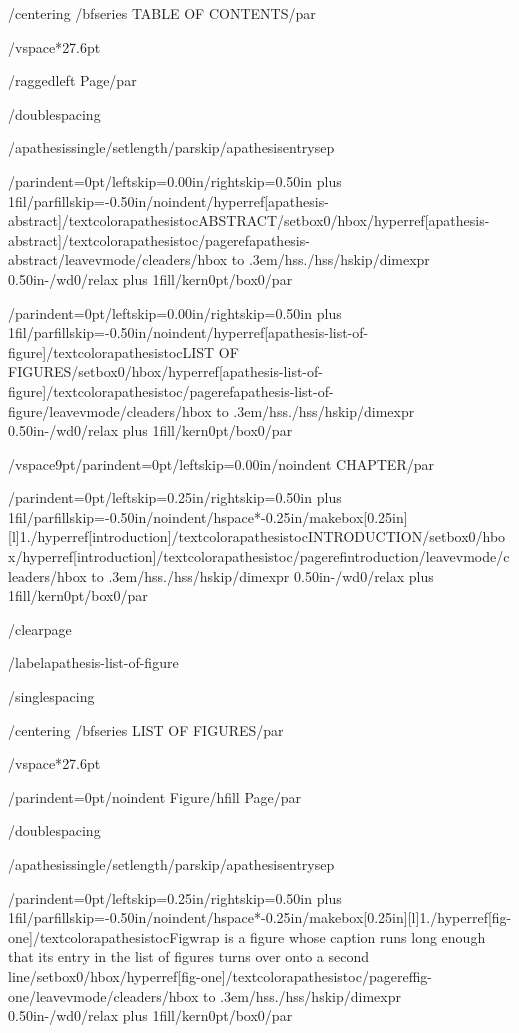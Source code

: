 {/centering
/bfseries TABLE OF CONTENTS/par}

/vspace*{27.6pt}

{/raggedleft
Page/par}

/doublespacing

{/apathesissingle/setlength{/parskip}{/apathesisentrysep}

{/parindent=0pt/leftskip=0.00in/rightskip=0.50in plus 1fil/parfillskip=-0.50in/noindent/hyperref[apathesis-abstract]{/textcolor{apathesistoc}{ABSTRACT}}/setbox0/hbox{/hyperref[apathesis-abstract]{/textcolor{apathesistoc}{/pageref{apathesis-abstract}}}}/leavevmode/cleaders/hbox to .3em{/hss./hss}/hskip/dimexpr 0.50in-/wd0/relax plus 1fill/kern0pt/box0/par}

{/parindent=0pt/leftskip=0.00in/rightskip=0.50in plus 1fil/parfillskip=-0.50in/noindent/hyperref[apathesis-list-of-figure]{/textcolor{apathesistoc}{LIST OF FIGURES}}/setbox0/hbox{/hyperref[apathesis-list-of-figure]{/textcolor{apathesistoc}{/pageref{apathesis-list-of-figure}}}}/leavevmode/cleaders/hbox to .3em{/hss./hss}/hskip/dimexpr 0.50in-/wd0/relax plus 1fill/kern0pt/box0/par}

/vspace{9pt}{/parindent=0pt/leftskip=0.00in/noindent CHAPTER/par}

{/parindent=0pt/leftskip=0.25in/rightskip=0.50in plus 1fil/parfillskip=-0.50in/noindent/hspace*{-0.25in}/makebox[0.25in][l]{1.}/hyperref[introduction]{/textcolor{apathesistoc}{INTRODUCTION}}/setbox0/hbox{/hyperref[introduction]{/textcolor{apathesistoc}{/pageref{introduction}}}}/leavevmode/cleaders/hbox to .3em{/hss./hss}/hskip/dimexpr 0.50in-/wd0/relax plus 1fill/kern0pt/box0/par}

}

/clearpage

/label{apathesis-list-of-figure}

/singlespacing

{/centering
/bfseries LIST OF FIGURES/par}

/vspace*{27.6pt}

{/parindent=0pt/noindent Figure/hfill Page/par}

/doublespacing

{/apathesissingle/setlength{/parskip}{/apathesisentrysep}

{/parindent=0pt/leftskip=0.25in/rightskip=0.50in plus 1fil/parfillskip=-0.50in/noindent/hspace*{-0.25in}/makebox[0.25in][l]{1.}/hyperref[fig-one]{/textcolor{apathesistoc}{Figwrap is a figure whose caption runs long enough that its entry in the
list of figures turns over onto a second line}}/setbox0/hbox{/hyperref[fig-one]{/textcolor{apathesistoc}{/pageref{fig-one}}}}/leavevmode/cleaders/hbox to .3em{/hss./hss}/hskip/dimexpr 0.50in-/wd0/relax plus 1fill/kern0pt/box0/par}

}

